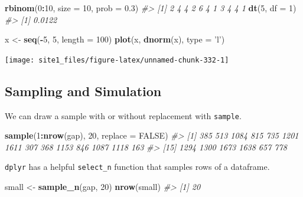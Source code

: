 \documentclass[]{book}
\newenvironment{Shaded}{\begin{snugshade}}{\end{snugshade}}
\newcommand{\KeywordTok}[1]{\textcolor[rgb]{0.13,0.29,0.53}{\textbf{#1}}}
\newcommand{\DataTypeTok}[1]{\textcolor[rgb]{0.13,0.29,0.53}{#1}}
\newcommand{\DecValTok}[1]{\textcolor[rgb]{0.00,0.00,0.81}{#1}}
\newcommand{\FloatTok}[1]{\textcolor[rgb]{0.00,0.00,0.81}{#1}}
\newcommand{\StringTok}[1]{\textcolor[rgb]{0.31,0.60,0.02}{#1}}
\newcommand{\CommentTok}[1]{\textcolor[rgb]{0.56,0.35,0.01}{\textit{#1}}}
\newcommand{\OtherTok}[1]{\textcolor[rgb]{0.56,0.35,0.01}{#1}}
\newcommand{\OperatorTok}[1]{\textcolor[rgb]{0.81,0.36,0.00}{\textbf{#1}}}
\newcommand{\NormalTok}[1]{#1}
\begin{document}
\begin{Shaded}
\begin{Highlighting}[]
\KeywordTok{rbinom}\NormalTok{(}\DecValTok{0}\OperatorTok{:}\DecValTok{10}\NormalTok{, }\DataTypeTok{size =} \DecValTok{10}\NormalTok{, }\DataTypeTok{prob =} \FloatTok{0.3}\NormalTok{)}
\CommentTok{#>  [1] 2 4 4 2 6 4 1 3 4 4 1}
\KeywordTok{dt}\NormalTok{(}\DecValTok{5}\NormalTok{, }\DataTypeTok{df =} \DecValTok{1}\NormalTok{)}
\CommentTok{#> [1] 0.0122}

\NormalTok{x <-}\StringTok{ }\KeywordTok{seq}\NormalTok{(}\OperatorTok{-}\DecValTok{5}\NormalTok{, }\DecValTok{5}\NormalTok{, }\DataTypeTok{length =} \DecValTok{100}\NormalTok{)}
\KeywordTok{plot}\NormalTok{(x, }\KeywordTok{dnorm}\NormalTok{(x), }\DataTypeTok{type =} \StringTok{'l'}\NormalTok{)}
\end{Highlighting}
\end{Shaded}

\begin{center}\texttt{[image: site1\_files/figure-latex/unnamed-chunk-332-1]} \end{center}

\subsection{Sampling and Simulation}\label{sampling-and-simulation}

We can draw a sample with or without replacement with \texttt{sample}.

\begin{Shaded}
\begin{Highlighting}[]
\KeywordTok{sample}\NormalTok{(}\DecValTok{1}\OperatorTok{:}\KeywordTok{nrow}\NormalTok{(gap), }\DecValTok{20}\NormalTok{, }\DataTypeTok{replace =} \OtherTok{FALSE}\NormalTok{)}
\CommentTok{#>  [1]  385  513 1084  815  735 1201 1611  307  368 1153  846 1087 1118  163}
\CommentTok{#> [15] 1294 1300 1673 1638  657  778}
\end{Highlighting}
\end{Shaded}

\texttt{dplyr} has a helpful \texttt{select\_n} function that samples
rows of a dataframe.

\begin{Shaded}
\begin{Highlighting}[]
\NormalTok{small <-}\StringTok{ }\KeywordTok{sample_n}\NormalTok{(gap, }\DecValTok{20}\NormalTok{)}
\KeywordTok{nrow}\NormalTok{(small)}
\CommentTok{#> [1] 20}
\end{Highlighting}
\end{Shaded}
\end{document}
